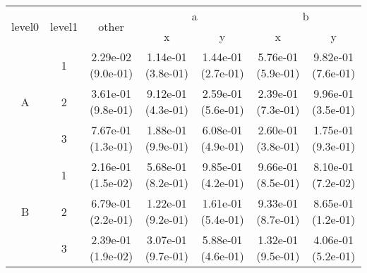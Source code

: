\begin{tabular}{ccccccc}
\toprule
\multirow{2}{*}{level0} & \multirow{2}{*}{level1}& \multirow{2}{*}{other}&\multicolumn{2}{c}{a}&\multicolumn{2}{c}{b}\tabularnewline
\cmidrule(lr){4-5}
\cmidrule(lr){6-7}
&&&x&y&x&y\tabularnewline
\midrule
\multirow{3}{*}{A}&1& 2.29e-02 (9.0e-01)& 1.14e-01 (3.8e-01)& 1.44e-01 (2.7e-01)& 5.76e-01 (5.9e-01)& 9.82e-01 (7.6e-01)\tabularnewline
&2& 3.61e-01 (9.8e-01)& 9.12e-01 (4.3e-01)& 2.59e-01 (5.6e-01)& 2.39e-01 (7.3e-01)& 9.96e-01 (3.5e-01)\tabularnewline
&3& 7.67e-01 (1.3e-01)& 1.88e-01 (9.9e-01)& 6.08e-01 (4.9e-01)& 2.60e-01 (3.8e-01)& 1.75e-01 (9.3e-01)\tabularnewline
\midrule
\multirow{3}{*}{B}&1& 2.16e-01 (1.5e-02)& 5.68e-01 (8.2e-01)& 9.85e-01 (4.2e-01)& 9.66e-01 (8.5e-01)& 8.10e-01 (7.2e-02)\tabularnewline
&2& 6.79e-01 (2.2e-01)& 1.22e-01 (9.2e-01)& 1.61e-01 (5.4e-01)& 9.33e-01 (8.7e-01)& 8.65e-01 (1.2e-01)\tabularnewline
&3& 2.39e-01 (1.9e-02)& 3.07e-01 (9.7e-01)& 5.88e-01 (4.6e-01)& 1.32e-01 (9.5e-01)& 4.06e-01 (5.2e-01)\tabularnewline
\bottomrule
\end{tabular}
